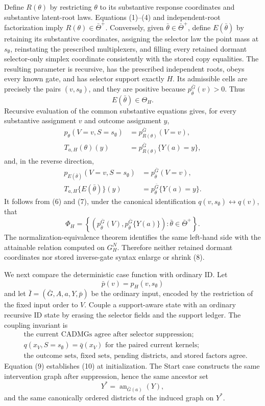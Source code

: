 Define \(R(\theta)\) by restricting \(\theta\) to its substantive response coordinates and substantive latent-root laws.  Equations (1)--(4) and independent-root factorization imply \(R(\theta)\in\bar\Theta^{+}\).  Conversely, given \(\bar\theta\in\bar\Theta^{+}\), define \(E(\bar\theta)\) by retaining its substantive coordinates, assigning the selector law the point mass at \(s_{\emptyset}\), reinstating the prescribed multiplexers, and filling every retained dormant selector-only simplex coordinate consistently with the stored copy equalities.  The resulting parameter is recursive, has the prescribed independent roots, obeys every known gate, and has selector support exactly \(H\).  Its admissible cells are precisely the pairs \((v,s_{\emptyset})\), and they are positive because \(p_{\bar\theta}^{\bar G}(v)>0\).  Thus
\[
 E(\bar\theta)\in\Theta_H.
 \tag{5}
\]
Recursive evaluation of the common substantive equations gives, for every substantive assignment \(v\) and outcome assignment \(y\),
\[
 \begin{aligned}
 p_\theta(V=v,S=s_{\emptyset})
   &=p_{R(\theta)}^{\bar G}(V=v),\\
 T_{a,H}(\theta)(y)
   &=p_{R(\theta)}^{\bar G}\{Y(a)=y\},
 \end{aligned}
 \tag{6}
\]
and, in the reverse direction,
\[
 \begin{aligned}
 p_{E(\bar\theta)}(V=v,S=s_{\emptyset})
   &=p_{\bar\theta}^{\bar G}(V=v),\\
 T_{a,H}\{E(\bar\theta)\}(y)
   &=p_{\bar\theta}^{\bar G}\{Y(a)=y\}.
 \end{aligned}
 \tag{7}
\]
It follows from (6) and (7), under the canonical identification \(q(v,s_{\emptyset})\leftrightarrow q(v)\), that
\[
 \Phi_H=
 \left\{
 \left(p_{\bar\theta}^{\bar G}(V),
       p_{\bar\theta}^{\bar G}\{Y(a)\}\right):
 \bar\theta\in\bar\Theta^{+}
 \right\}.
 \tag{8}
\]
The normalization-equivalence theorem identifies the same left-hand side with the attainable relation computed on \(G_H^N\).  Therefore neither retained dormant coordinates nor stored inverse-gate syntax enlarge or shrink (8).

We next compare the deterministic case function with ordinary ID.  Let
\[
 \bar p(v)=p_H(v,s_{\emptyset})
 \tag{9}
\]
and let \(\bar I=(\bar G,A,a,Y,\bar p)\) be the ordinary input, encoded by the restriction of the fixed input order to \(V\).  Couple a support-aware state with an ordinary recursive ID state by erasing the selector fields and the support ledger.  The coupling invariant is
\[
 \begin{aligned}
 &\text{the current CADMGs agree after selector suppression;}\\
 &q(x_V,S=s_{\emptyset})=\bar q(x_V)\text{ for the paired current kernels;}\\
 &\text{the outcome sets, fixed sets, pending districts, and stored factors agree.}
 \end{aligned}
 \tag{10}
\]
Equation (9) establishes (10) at initialization.  The Start case constructs the same intervention graph after suppression, hence the same ancestor set
\[
 Y^{*}=\operatorname{an}_{\bar G(a)}(Y),
 \tag{11}
\]
and the same canonically ordered districts of the induced graph on \(Y^{*}\).

